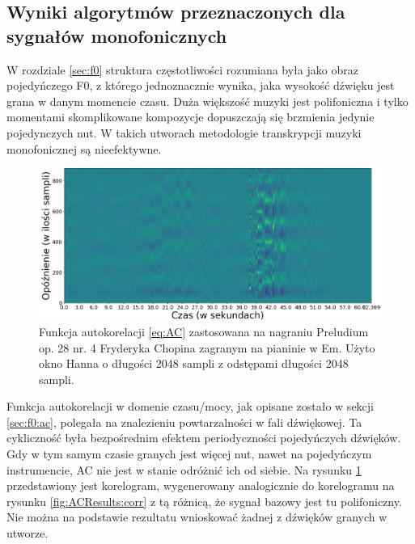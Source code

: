 \documentclass[12pt,a4paper,twoside]{mwart}
\begin{document}
\subsection{Wyniki algorytmów przeznaczonych dla sygnałów monofonicznych}\label{sec:MultiPitch:monofon}
W rozdziale \ref{sec:f0} struktura częstotliwości rozumiana była jako obraz pojedyńczego F0, z którego jednoznacznie wynika, jaka wysokość dźwięku jest grana w danym momencie czasu. Duża większość muzyki jest polifoniczna i tylko momentami skomplikowane kompozycje dopuszczają się brzmienia jedynie pojedynczych nut. W takich utworach metodologie transkrypcji muzyki monofonicznej są nieefektywne.

\begin{figure}[ht]
  \begin{center}
    \includegraphics[scale=0.38]{images/AC/korelogram_multif0_cropped.png}
    \caption{Funkcja autokorelacji \ref{eq:AC} zastosowana na nagraniu Preludium op. 28 nr. 4 Fryderyka Chopina zagranym na pianinie w Em. Użyto okno Hanna o długości 2048 sampli z odstępami długości 2048 sampli.}
    \label{fig:multi:ac}
  \end{center}
\end{figure}

Funkcja autokorelacji w domenie czasu/mocy, jak opisane zostało w sekcji \ref{sec:f0:ac}, polegała na znalezieniu powtarzalności w fali dźwiękowej. Ta cykliczność była bezpośrednim efektem periodyczności pojedyńczych dźwięków. Gdy w tym samym czasie granych jest więcej nut, nawet na pojedyńczym instrumencie, AC nie jest w stanie odróżnić ich od siebie. Na rysunku \ref{fig:multi:ac} przedstawiony jest korelogram, wygenerowany analogicznie do korelogramu na rysunku \ref{fig:ACResults:corr} z tą różnicą, że sygnał bazowy jest tu polifoniczny.  Nie można na podstawie rezultatu wnioskować żadnej z dźwięków granych w utworze.
\end{document}
